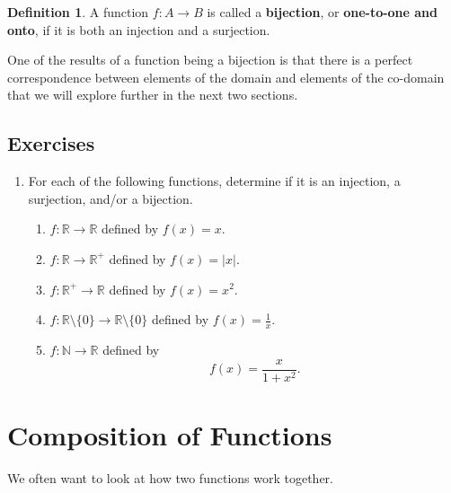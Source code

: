 \documentclass[
]{book}
\theoremstyle{definition}
\newtheorem{definition}{Definition}[chapter]
\theoremstyle{definition}
\theoremstyle{definition}
\theoremstyle{remark}
\begin{document}
\begin{definition}
\protect\hypertarget{def:unnamed-chunk-137}{}{\label{def:unnamed-chunk-137} }A function \(f:A\rightarrow B\) is called a \textbf{bijection}, or \textbf{one-to-one and onto}, if it is both an injection and a surjection.
\end{definition}

One of the results of a function being a bijection is that there is a perfect correspondence between elements of the domain and elements of the co-domain that we will explore further in the next two sections.

\hypertarget{exercises-17}{%
\subsection{Exercises}\label{exercises-17}}

\begin{enumerate}
\def\labelenumi{\arabic{enumi}.}
\item
  For each of the following functions, determine if it is an injection, a surjection, and/or a bijection.

  \begin{enumerate}
  \def\labelenumii{\alph{enumii}.}
  \item
    \(f:\mathbb{R}\rightarrow \mathbb{R}\) defined by \(f(x)=x\).
  \item
    \(f:\mathbb{R} \rightarrow \mathbb{R}^+\) defined by \(f(x)=|x|\).
  \item
    \(f:\mathbb{R}^+ \rightarrow \mathbb{R}\) defined by \(f(x)=x^2\).
  \item
    \(f:\mathbb{R}\setminus \{0\} \rightarrow \mathbb{R}\setminus \{0\}\) defined by \(f(x)=\frac{1}{x}\).
  \item
    \(f:\mathbb{N} \rightarrow \mathbb{R}\) defined by \[f(x)=\frac{x}{1+x^2}.\]
  \end{enumerate}
\end{enumerate}

\hypertarget{sec:Compositions}{%
\section{Composition of Functions}\label{sec:Compositions}}

We often want to look at how two functions work together.
\end{document}
